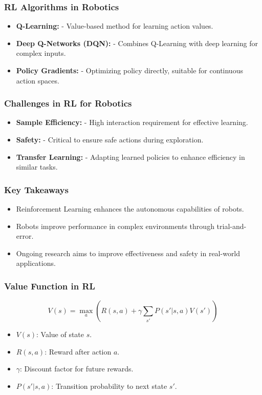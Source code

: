 \documentclass[aspectratio=169]{beamer}
\begin{document}
\begin{frame}[fragile]
    \frametitle{RL Algorithms in Robotics}
    \begin{itemize}
        \item \textbf{Q-Learning:} 
            - Value-based method for learning action values.
        \item \textbf{Deep Q-Networks (DQN):} 
            - Combines Q-Learning with deep learning for complex inputs.
        \item \textbf{Policy Gradients:} 
            - Optimizing policy directly, suitable for continuous action spaces.
    \end{itemize}
\end{frame}

\begin{frame}[fragile]
    \frametitle{Challenges in RL for Robotics}
    \begin{itemize}
        \item \textbf{Sample Efficiency:} 
            - High interaction requirement for effective learning.
        \item \textbf{Safety:} 
            - Critical to ensure safe actions during exploration.
        \item \textbf{Transfer Learning:} 
            - Adapting learned policies to enhance efficiency in similar tasks.
    \end{itemize}
\end{frame}

\begin{frame}[fragile]
    \frametitle{Key Takeaways}
    \begin{itemize}
        \item Reinforcement Learning enhances the autonomous capabilities of robots.
        \item Robots improve performance in complex environments through trial-and-error.
        \item Ongoing research aims to improve effectiveness and safety in real-world applications.
    \end{itemize}
\end{frame}

\begin{frame}[fragile]
    \frametitle{Value Function in RL}
    \begin{equation}
        V(s) = \max_{a} \left( R(s, a) + \gamma \sum_{s'} P(s' | s, a) V(s') \right)
    \end{equation}
    \begin{itemize}
        \item \( V(s) \): Value of state \( s \).
        \item \( R(s, a) \): Reward after action \( a \).
        \item \( \gamma \): Discount factor for future rewards.
        \item \( P(s' | s, a) \): Transition probability to next state \( s' \).
    \end{itemize}
\end{frame}
\end{document}
